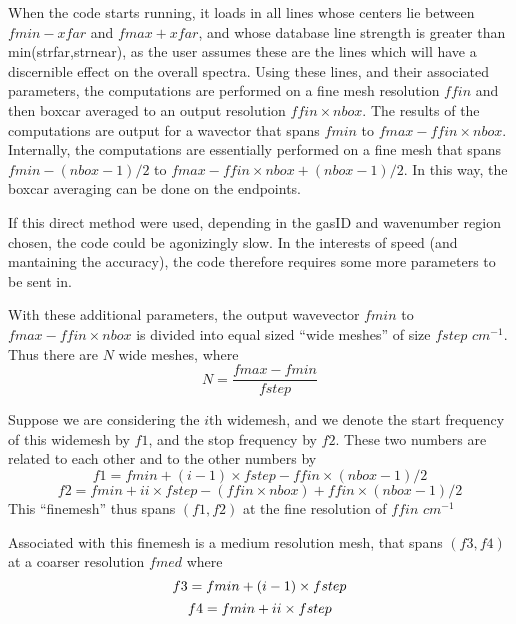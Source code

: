 \documentclass[11pt]{article}
\begin{document}
When the code starts running, it loads in all lines whose centers lie 
between $fmin - xfar$ and $fmax + xfar$, and whose database line strength 
is greater than min(strfar,strnear), as the user assumes these are the 
lines which will have a discernible effect on the overall spectra. Using 
these lines, and their associated parameters, the computations are 
performed on a fine mesh resolution $ffin$ and then boxcar
averaged to an output resolution $ffin \times nbox$. The results of the 
computations are output for a wavector that spans $fmin$ to $fmax-ffin 
\times nbox$. Internally, the computations are essentially performed on a 
fine mesh that spans $fmin - (nbox-1)/2 $ to $fmax-ffin \times nbox + 
(nbox-1)/2$. In this way, the boxcar averaging can be done on the endpoints.

If this direct method were used, depending in the gasID and wavenumber 
region chosen, the code could be agonizingly slow. In the interests of 
speed (and mantaining the accuracy), the code therefore requires some more 
parameters to be sent in. 

With these additional parameters, the output wavevector $fmin$ to 
$fmax-ffin \times nbox$ is divided into equal sized ``wide meshes'' of 
size $fstep$ $cm^{-1}$. Thus there are $N$ wide meshes, where
\begin{equation}
N = \frac{fmax-fmin}{fstep}
\end{equation}

Suppose we are considering the $i$th  widemesh, and we denote the start 
frequency  of this widemesh by $f1$, and the stop frequency by $f2$. These 
two numbers are related to each other and to the other numbers by 
\begin{displaymath}
f1 = fmin + (i-1) \times fstep - ffin \times (nbox-1)/2 
\end{displaymath}
\begin{equation}
f2 = fmin + ii \times fstep - (ffin \times nbox) + ffin \times (nbox-1)/2
\end{equation}
This ``finemesh'' thus spans $(f1,f2)$ at the fine resolution of 
$ffin$ $cm^{-1}$

Associated with this finemesh is a medium resolution mesh, that spans 
$(f3,f4)$ at a coarser resolution $fmed$ where
\begin{displaymath}
f3 = fmin + (i-1) \times fstep\\
\end{displaymath}
\begin{equation}
f4 = fmin + ii \times fstep\\
\end{equation}
\end{document}
